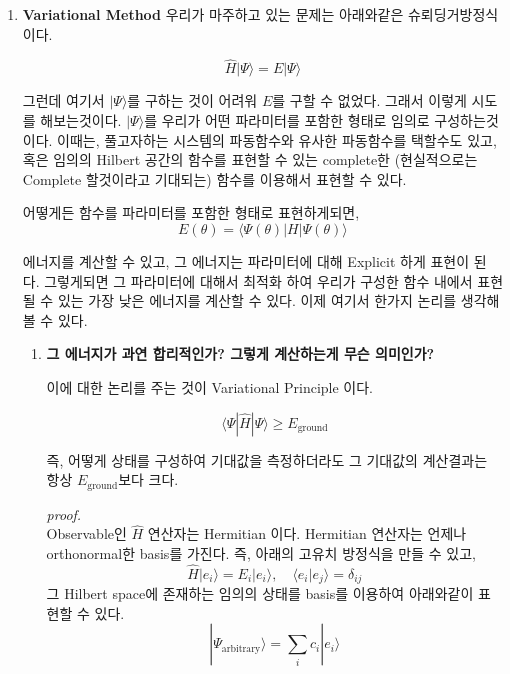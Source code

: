 \documentclass[10pt]{article}
\begin{document}
\begin{enumerate}[label=2)]
\item {\Large \textbf{Variational Method}}
우리가 마주하고 있는 문제는 아래와같은 슈뢰딩거방정식이다.

\[
\hat{H}|\Psi\rangle = E|\Psi\rangle
\]

그런데 여기서 $|\Psi\rangle$를 구하는 것이 어려워 $E$를 구할 수 없었다. 
그래서 이렇게 시도를 해보는것이다. $|\Psi\rangle$를 우리가 어떤 파라미터를 포함한 형태로 임의로 구성하는것이다. 
이때는, 풀고자하는 시스템의 파동함수와 유사한 파동함수를 택할수도 있고,
혹은 임의의 Hilbert 공간의 함수를 표현할 수 있는 complete한 (현실적으로는 Complete 할것이라고 기대되는) 함수를 이용해서 표현할 수 있다.

어떻게든 함수를 파라미터를 포함한 형태로 표현하게되면,
\[
E(\theta) = \langle \Psi(\theta) | H | \Psi(\theta) \rangle
\]

에너지를 계산할 수 있고, 그 에너지는 파라미터에 대해 Explicit 하게 표현이 된다. 
그렇게되면 그 파라미터에 대해서 최적화 하여 우리가 구성한 함수 내에서 표현될 수 있는 가장 낮은 에너지를 계산할 수 있다. 
이제 여기서 한가지 논리를 생각해볼 수 있다.

\begin{enumerate}[label=*]
\item  \textbf{그 에너지가 과연 합리적인가? 그렇게 계산하는게 무슨 의미인가?}

이에 대한 논리를 주는 것이 Variational Principle 이다.

\begin{tcolorbox}[enhanced, breakable, colback=gray!10, colframe=black, title=Definition: Variation Principle]

\[
\langle \Psi | \hat{H} | \Psi \rangle \geq E_{\text{ground}}
\]

즉, 어떻게 상태를 구성하여 기대값을 측정하더라도 그 기대값의 계산결과는 항상 $E_{\text{ground}}$보다 크다.

\end{tcolorbox}

\begin{mdframed}
\textit{proof.} \\
Observable인 $\hat{H}$ 연산자는 Hermitian 이다. Hermitian 연산자는 언제나 orthonormal한 basis를 가진다. 즉, 아래의 고유치 방정식을 만들 수 있고,
\[
\hat{H} |e_i \rangle = E_i |e_i \rangle, \quad \langle e_i | e_j \rangle = \delta_{ij}
\]
그 Hilbert space에 존재하는 임의의 상태를 basis를 이용하여 아래와같이 표현할 수 있다.
\[
|\Psi_{\text{arbitrary}}\rangle = \sum_i c_i |e_i\rangle \tag{1}
\]


\end{mdframed}
\end{enumerate}
\end{enumerate}
\end{document}
